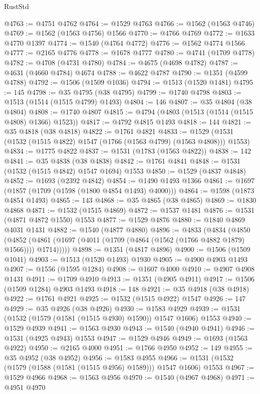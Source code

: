 \begin{lexlean}{RustStd}
\begin{coremodule}
@4763 := @4751 @4762
@4764 := @1529 @4763
@4766 := @1562 (@1563 @4746)
@4769 := @1562 (@1563 @4756) @1566
@4770 := @4766 @4769
@4772 := @1633 @4770 @1397
@4774 := @1540 (@4764 @4772)
@4776 := @1562 @4774 @1566
@4777 := @2165 @4776
@4778 := @1678 @4777
@4780 := @4741 (@1709 @4778)
@4782 := @4708 (@4731 @4780)
@4784 := @4675 (@4698 @4782)
@4787 := @4631 (@4660 @4784) @4674
@4788 := @4622 @4787
@4790 := @1351 (@4599 @4788)
@4792 := @1506 (@1509 @1036)
@4794 := @1513 (@1520 @1481)
@4795 := 145
@4798 := @35 @4795 (@38 @4795)
@4799 := @1740 @4798
@4803 := @1513 (@1514 (@1515 @4799) @1493)
@4804 := 146
@4807 := @35 @4804 (@38 @4804)
@4808 := @1740 @4807
@4815 := @4794 (@4803 (@1513 (@1514 (@1515 @4808) @1366) @1523))
@4817 := @4792 @4815 @1493
@4818 := 144
@4821 := @35 @4818 (@38 @4818)
@4822 := @1761 @4821
@4833 := @1529 (@1531 (@1532 (@1515 @4822) @1547 (@1766 (@1563 @4799) (@1563 @4808))) @1553)
@4834 := @1775 @4822
@4837 := @1531 (@1783 (@1563 @4822))
@4838 := 142
@4841 := @35 @4838 (@38 @4838)
@4842 := @1761 @4841
@4848 := @1531 (@1532 (@1515 @4842) @1547 @1694) @1553
@4850 := @1529 (@4837 @4848)
@4852 := @1693 (@2392 @4842)
@4854 := @1490 @1493 @1366
@4861 := @1697 (@1857 (@1709 (@1598 (@1800 @4854 @1493) @4000)))
@4864 := @1598 (@1873 @4854 @1493)
@4865 := 143
@4868 := @35 @4865 (@38 @4865)
@4869 := @1830 @4868
@4871 := @1532 (@1515 @4869)
@4872 := @1537 @1481
@4876 := @1531 (@4871 @4872 @1550) @1553
@4877 := @1529 @4876
@4880 := @1840 @4869 @4031 @1431
@4882 := @1540 (@4877 @4880)
@4896 := @4833
    (@4834
      (@4850
        (@4852 (@4861 (@1697 (@4011 (@1709 (@4864 (@1562 (@1766 @4882 @1879) @1566)))) @1714)))))
@4898 := @1351 (@4817 @4896)
@4900 := @1506 (@1509 @1041)
@4903 := @1513 (@1520 @1493) @1930
@4905 := @4900 @4903 @1493
@4907 := @1556 (@1595 @1284)
@4908 := @1607 @4000
@4910 := @4907 @4908 @1431
@4911 := @1709 @4910
@4913 := @1351 (@4905 @4911)
@4917 := @1506 (@1509 @1284) @4903 @1493
@4918 := 148
@4921 := @35 @4918 (@38 @4918)
@4922 := @1761 @4921
@4925 := @1532 (@1515 @4922) @1547
@4926 := 147
@4929 := @35 @4926 (@38 @4926)
@4930 := @1583 @4929
@4939 := @1531 (@1532 (@1579 (@1581 (@1515 @4930) @1590)) @1547 @1606) @1553
@4940 := @1529 @4939
@4941 := @1563 @4930
@4943 := @1540 (@4940 @4941)
@4946 := @1531 (@4925 @4943) @1553
@4947 := @1529 @4946
@4949 := @1693 (@1563 @4922)
@4950 := @2165 @4000
@4951 := @1766 @4950
@4952 := 149
@4955 := @35 @4952 (@38 @4952)
@4956 := @1583 @4955
@4966 := @1531 (@1532 (@1579 (@1588 (@1581 (@1515 @4956) @1589))) @1547 @1606) @1553
@4967 := @1529 @4966
@4968 := @1563 @4956
@4970 := @1540 (@4967 @4968)
@4971 := @4951 @4970

\end{coremodule}
\end{lexlean}
